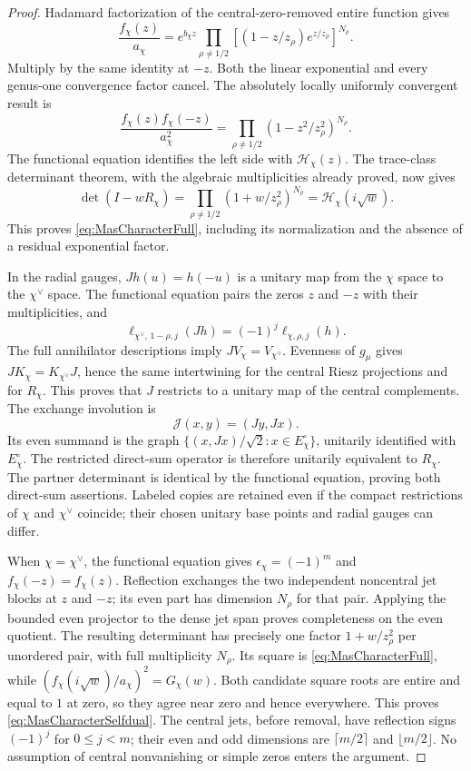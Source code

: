 \begin{proof}
Hadamard factorization of the central-zero-removed entire function gives
\[
 \frac{f_\chi(z)}{a_\chi}
 =e^{b_\chi z}\prod_{\rho\ne1/2}
 \left[(1-z/z_\rho)e^{z/z_\rho}\right]^{N_\rho}.
\]
Multiply by the same identity at $-z$. Both the linear exponential and every genus-one convergence factor cancel. The absolutely locally uniformly convergent result is
\[
 \frac{f_\chi(z)f_\chi(-z)}{a_\chi^2}
 =\prod_{\rho\ne1/2}(1-z^2/z_\rho^2)^{N_\rho}.
\]
The functional equation identifies the left side with $\mathcal H_\chi(z)$. The trace-class determinant theorem, with the algebraic multiplicities already proved, now gives
\[
 \det(I-wR_\chi)
 =\prod_{\rho\ne1/2}(1+w/z_\rho^2)^{N_\rho}
 =\mathcal H_\chi(i\sqrt w).
\]
This proves \eqref{eq:MasCharacterFull}, including its normalization and the absence of a residual exponential factor.

In the radial gauges, $J h(u)=h(-u)$ is a unitary map from the $\chi$ space to the $\chi^\vee$ space. The functional equation pairs the zeros $z$ and $-z$ with their multiplicities, and
\[
 \ell_{\chi^\vee,\,1-\rho,j}(Jh)=(-1)^j\ell_{\chi,\rho,j}(h).
\]
The full annihilator descriptions imply $JV_\chi=V_{\chi^\vee}$. Evenness of $g_\mu$ gives $JK_\chi=K_{\chi^\vee}J$, hence the same intertwining for the central Riesz projections and for $R_\chi$. This proves that $J$ restricts to a unitary map of the central complements. The exchange involution is
\[
 \mathcal J(x,y)=(Jy,Jx).
\]
Its even summand is the graph $\{(x,Jx)/\sqrt2:x\in E_\chi^\circ\}$, unitarily identified with $E_\chi^\circ$. The restricted direct-sum operator is therefore unitarily equivalent to $R_\chi$. The partner determinant is identical by the functional equation, proving both direct-sum assertions. Labeled copies are retained even if the compact restrictions of $\chi$ and $\chi^\vee$ coincide; their chosen unitary base points and radial gauges can differ.

When $\chi=\chi^\vee$, the functional equation gives $\epsilon_\chi=(-1)^m$ and $f_\chi(-z)=f_\chi(z)$. Reflection exchanges the two independent noncentral jet blocks at $z$ and $-z$; its even part has dimension $N_\rho$ for that pair. Applying the bounded even projector to the dense jet span proves completeness on the even quotient. The resulting determinant has precisely one factor $1+w/z_\rho^2$ per unordered pair, with full multiplicity $N_\rho$. Its square is \eqref{eq:MasCharacterFull}, while $(f_\chi(i\sqrt w)/a_\chi)^2=G_\chi(w)$. Both candidate square roots are entire and equal to $1$ at zero, so they agree near zero and hence everywhere. This proves \eqref{eq:MasCharacterSelfdual}. The central jets, before removal, have reflection signs $(-1)^j$ for $0\le j<m$; their even and odd dimensions are $\lceil m/2\rceil$ and $\lfloor m/2\rfloor$. No assumption of central nonvanishing or simple zeros enters the argument.
\end{proof}

